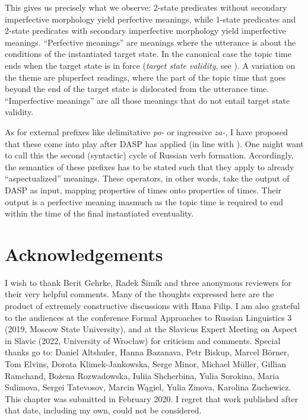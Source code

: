 \documentclass[output=paper,colorlinks,citecolor=brown]{langscibook}
\begin{document}
This gives us precisely what we observe: 2-state predicates without secondary imperfective morphology yield perfective meanings, 
while 1-state predicates and 2-state predicates with secondary imperfective morphology yield imperfective meanings. 
``Perfective meanings'' are meanings where the utterance is about the conditions of the instantiated target state. 
In the canonical case the topic time ends when the target state is in force (\textit{target state validity}, see \citealt{Gronn2004}). A variation on the theme are 
pluperfect readings, where the part of the topic time 
that goes beyond the end of the target state is dislocated from the utterance time. ``Imperfective meanings''
are all those meanings that do not entail target state validity. 

As for external prefixes like delimitative \textit{po-} or ingressive \textit{za-}, I have proposed that these come into play after DASP has applied (in line with \citealt{Ramchand2004, Ramchand08}). One might want to call this the second (syntactic) cycle of Russian verb formation. Accordingly, the semantics of these prefixes has to be stated such that they apply to already ``aspectualized'' meanings. 
These operators, in other words, take the output of DASP as input, mapping properties of times onto properties of times. Their output is a perfective meaning inasmuch as the topic time is required to end within the time of the final instantiated eventuality.   


\section*{Acknowledgements}
I wish to thank Berit Gehrke, Radek \v{S}im\'ik and three anonymous reviewers for their very helpful comments.
Many of the thoughts expressed here are the product of extremely constructive discussions with Hana Filip. 
I am also grateful to the audiences at the conference Formal Approaches to Russian Linguistics 3 (2019, Moscow State University), and at the Slavicus Expert Meeting on Aspect in Slavic (2022, University of Wroc\l{a}w) for criticism and comments. Special thanks go to: Daniel Altshuler, Hanna Bazanava, Petr Biskup, Marcel B\"orner, Tom Elvins, Dorota Klimek-Jankowska, Serge Minor, Michael M\"uller, Gillian Ram\-chand, Bo\.{z}ena Rozwadowska, Iuliia Shcherbina, Yulia Sorokina, Maria Su\-li\-mo\-va, Sergei Tatevosov, Marcin W\k agiel, Yulia Zinova, Karolina Zuchewicz. 
This chapter was submitted in February 2020. I regret that work published after that date, including my own, could not be considered. 
\end{document}
